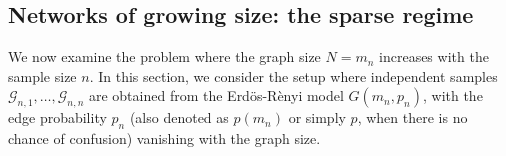 \documentclass[12pt]{article}
\def\er{ Erd{\"o}s-R{\`e}nyi }
\numberwithin{equation}{section}
\begin{document}


\subsection{Networks of growing size: the sparse regime}{\label{subsec:sparse_regime}}


We now examine the problem where the graph size $N=m_n$ increases with the sample size $n$. In this section, we consider the setup where independent samples $\mathcal{G}_{n,1}, \ldots, \mathcal{G}_{n,n}$  are obtained from the \er model $G(m_n,p_n)$, with the edge probability $p_n$ (also denoted as $p(m_n)$ or simply $p$, when there is no chance of confusion) vanishing with the graph size.    
\end{document}
